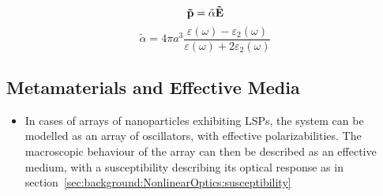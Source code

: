 \begin{equation}\label{eq:Plasmonics:LSPdipole}
    {\bf{\tilde p}} = {{\tilde \alpha }}{\bf{\tilde E}}
\end{equation}
\begin{equation}\label{eq:Plasmonics:LSPalphaSphere}
    {\tilde \alpha } = 4\pi a^3 \frac{\varepsilon (\omega) - \varepsilon_2 (\omega)}{\varepsilon (\omega) + 2\varepsilon_2 (\omega)}
\end{equation}

\subsection{Metamaterials and Effective Media}
\begin{itemize}
    \item In cases of arrays of nanoparticles exhibiting LSPs, the system can be modelled as an array of oscillators, with effective polarizabilities. The macroscopic behaviour of the array can then be described as an effective medium, with a susceptibility describing its optical response as in section~\ref{sec:background:NonlinearOptics:susceptibility}
\end{itemize}


